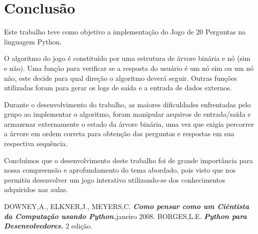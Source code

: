 \documentclass[12pt]{article}
\begin{document}
\section{Conclusão}
Este  trabalho teve como objetivo a implementação do Jogo de 20 Perguntas na linguagem Python.
\par O algoritmo do jogo é constituído por uma estrutura de árvore binária e nó (sim e não). Uma função para verificar se a resposta do usuário é um nó sim ou um nó não, este decide para qual direção o algoritmo deverá seguir. Outras funções utilizadas foram para gerar os logs de saída e a entrada de dados externos.
\par Durante o desenvolvimento do trabalho, as maiores dificuldades enfrentadas pelo grupo ao implementar o algoritmo, foram manipular arquivos de entrada/saída e armazenar externamente o estado da árvore binária, uma vez que exigia percorrer a árvore em ordem correta para obtenção das perguntas e respostas em sua respectiva sequência.
\par Concluímos que o desenvolvimento deste trabalho foi de grande importância para nossa compreensão e aprofundamento do tema abordado, pois visto que nos permitiu desenvolver um jogo interativo utilizando-se dos conhecimentos adquiridos nas aulas.
	
\newpage
\begin{thebibliography}{1}
		
		DOWNEY,A., ELKNER,J., MEYERS,C.
		\textbf{\textit{Como pensar como um Ciêntista da Computação usando Python.}}janeiro 2008.
		BORGES,L.E.
		\textbf{\textit{Python para Desenvolvedores.}}
		2 edição.
		
		
\end{thebibliography}%
\thispagestyle{empty}
\end{document}
